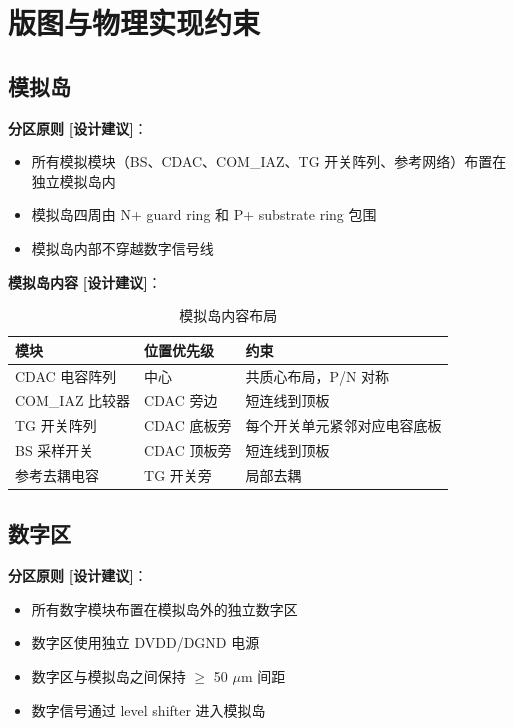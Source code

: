 \documentclass[UTF8,a4paper,11pt]{ctexart}
\newcommand{\suggested}{\textcolor{suggestblue}{\textbf{[设计建议]}}}
\providecommand{\textmu}{\ensuremath{\mu}}
\begin{document}
\section{版图与物理实现约束}

\subsection{模拟岛}

\textbf{分区原则} \suggested：
\begin{itemize}[leftmargin=2em]
\item 所有模拟模块（BS、CDAC、COM\_IAZ、TG 开关阵列、参考网络）布置在独立模拟岛内
\item 模拟岛四周由 N+ guard ring 和 P+ substrate ring 包围
\item 模拟岛内部不穿越数字信号线
\end{itemize}

\textbf{模拟岛内容} \suggested：

\begin{table}[H]
\centering
\caption{模拟岛内容布局}
\label{tab:analog-island}
\begin{tabular}{lll}
\toprule
模块 & 位置优先级 & 约束 \\
\midrule
CDAC 电容阵列   & 中心     & 共质心布局，P/N 对称 \\
COM\_IAZ 比较器 & CDAC 旁边 & 短连线到顶板 \\
TG 开关阵列     & CDAC 底板旁 & 每个开关单元紧邻对应电容底板 \\
BS 采样开关     & CDAC 顶板旁 & 短连线到顶板 \\
参考去耦电容     & TG 开关旁 & 局部去耦 \\
\bottomrule
\end{tabular}
\end{table}

\subsection{数字区}

\textbf{分区原则} \suggested：
\begin{itemize}[leftmargin=2em]
\item 所有数字模块布置在模拟岛外的独立数字区
\item 数字区使用独立 DVDD/DGND 电源
\item 数字区与模拟岛之间保持 $\geq$ 50 \textmu m 间距
\item 数字信号通过 level shifter 进入模拟岛
\end{itemize}
\end{document}
